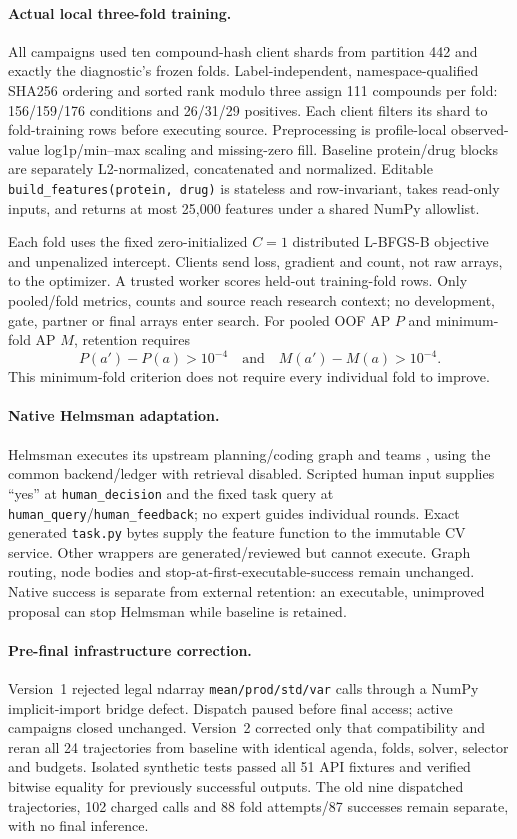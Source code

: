 \paragraph{Actual local three-fold training.}
All campaigns used ten compound-hash client shards from partition 442 and exactly the diagnostic's frozen folds. Label-independent, namespace-qualified SHA256 ordering and sorted rank modulo three assign 111 compounds per fold: 156/159/176 conditions and 26/31/29 positives. Each client filters its shard to fold-training rows before executing source. Preprocessing is profile-local observed-value log1p/min--max scaling and missing-zero fill. Baseline protein/drug blocks are separately L2-normalized, concatenated and normalized. Editable \texttt{build\_features(protein, drug)} is stateless and row-invariant, takes read-only inputs, and returns at most 25,000 features under a shared NumPy allowlist.

Each fold uses the fixed zero-initialized $C=1$ distributed L-BFGS-B objective and unpenalized intercept. Clients send loss, gradient and count, not raw arrays, to the optimizer. A trusted worker scores held-out training-fold rows. Only pooled/fold metrics, counts and source reach research context; no development, gate, partner or final arrays enter search. For pooled OOF AP $P$ and minimum-fold AP $M$, retention requires
\[
P(a')-P(a)>10^{-4}\quad\text{and}\quad M(a')-M(a)>10^{-4}.
\]
This minimum-fold criterion does not require every individual fold to improve.

\paragraph{Native Helmsman adaptation.}
Helmsman executes its upstream planning/coding graph and teams \citep{Li2025Helmsman}, using the common backend/ledger with retrieval disabled. Scripted human input supplies ``yes'' at \texttt{human\_decision} and the fixed task query at \texttt{human\_query}/\texttt{human\_feedback}; no expert guides individual rounds. Exact generated \texttt{task.py} bytes supply the feature function to the immutable CV service. Other wrappers are generated/reviewed but cannot execute. Graph routing, node bodies and stop-at-first-executable-success remain unchanged. Native success is separate from external retention: an executable, unimproved proposal can stop Helmsman while baseline is retained.

\paragraph{Pre-final infrastructure correction.}
Version~1 rejected legal ndarray \texttt{mean/prod/std/var} calls through a NumPy implicit-import bridge defect. Dispatch paused before final access; active campaigns closed unchanged. Version~2 corrected only that compatibility and reran all 24 trajectories from baseline with identical agenda, folds, solver, selector and budgets. Isolated synthetic tests passed all 51 API fixtures and verified bitwise equality for previously successful outputs. The old nine dispatched trajectories, 102 charged calls and 88 fold attempts/87 successes remain separate, with no final inference.


